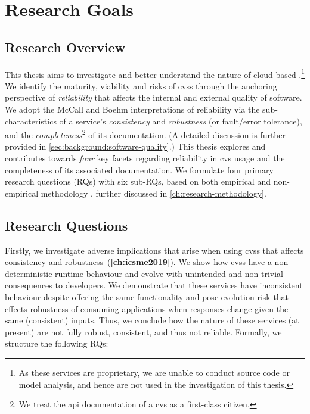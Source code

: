 \section{Research Goals}
\label{sec:introduction:hypohtesis}

\subsection{Research Overview}


This thesis aims to investigate and better understand the nature of cloud-based .\footnote{As these services are proprietary, we are unable to conduct source code or model analysis, and hence are not used in the investigation of this thesis.} 
We identify the maturity, viability and risks of \glspl{cvs} through the anchoring perspective of \textit{reliability} that affects the internal and external quality of software. We adopt the McCall \citep{McCall:1977uy} and Boehm \citep{Boehm:1978vv} interpretations of reliability via the sub-characteristics of a service's \textit{consistency} and \textit{robustness} (or fault/error tolerance), and the \textit{completeness}\footnote{We treat the \gls{api} documentation of a \gls{cvs} as a first-class citizen.} of its documentation. (A detailed discussion is further provided in \cref{sec:background:software-quality}.)
This thesis explores and contributes towards \textit{four} key facets regarding reliability in \gls{cvs} usage and the completeness of its associated documentation. We formulate four primary research questions (RQs) with six sub-RQs, based on both empirical and non-empirical  methodology \citep{Shull:2007vh,Simon:1996uw}, further discussed in \cref{ch:research-methodology}.

\subsection{Research Questions}

Firstly, we investigate adverse implications that arise when using \glspl{cvs} that affects consistency and robustness~(\textbf{\cref{ch:icsme2019}}). We show how \glspl{cvs} have a non-deterministic runtime behaviour and evolve with unintended and non-trivial consequences to developers. We demonstrate that these services have inconsistent behaviour despite offering the same functionality and pose evolution risk that effects robustness of consuming applications when responses change given the same (consistent) inputs. Thus, we conclude how the nature of these services (at present) are not fully robust, consistent, and thus not reliable. Formally, we structure the following RQs:

